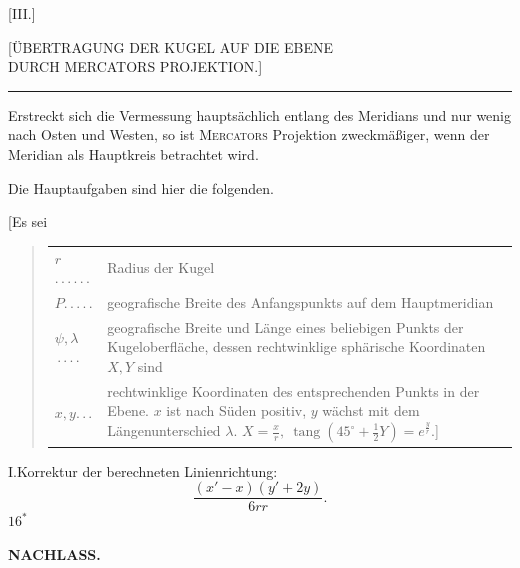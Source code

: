 \par\clearpage

\thispagestyle{empty}
\vspace*{4\baselineskip}
\begin{center}
{\large [III.]}\par\bigskip
{\Large [ÜBERTRAGUNG DER KUGEL AUF DIE EBENE\\
DURCH MERCATORS PROJEKTION.]}\par\bigskip
\rule{.09\linewidth}{.4pt}\par\bigskip
[1.]
\end{center}
Erstreckt sich die Vermessung hauptsächlich entlang des Meridians und nur
wenig nach Osten und Westen, so ist \textsc{Mercators} Projektion zweckmäßiger,
wenn der Meridian als Hauptkreis betrachtet wird.

Die Hauptaufgaben sind hier die folgenden.

[Es sei
\begin{quote}
\setlength{\tabcolsep}{0pt}
\begin{tabular}{@{}lp{.82\linewidth}@{}}
\(r\)\enspace.\,.\,.\,.\,.\,. & Radius der Kugel\\
\(P\)\enspace.\,.\,.\,.\,. & geografische Breite des Anfangspunkts auf dem Hauptmeridian\\
\(\psi,\lambda\)\,.\,.\,.\,. & geografische Breite und Länge eines beliebigen Punkts der
Kugeloberfläche, dessen rechtwinklige sphärische Koordinaten \(X,Y\) sind\\
\(x,y\)\enspace.\,.\,. & rechtwinklige Koordinaten des entsprechenden Punkts in der Ebene.
\(x\) ist nach Süden positiv, \(y\) wächst mit dem Längenunterschied \(\lambda\).
\quad \(X=\frac xr,\ \operatorname{tang}(45^\circ+\tfrac12Y)=e^{\frac yr}\).]
\end{tabular}
\end{quote}
I.\quad Korrektur der berechneten Linienrichtung:
\[
\frac{(x'-x)(y'+2y)}{6rr}.
\]
\noindent\hfill \(16^{*}\)\hspace*{.14\linewidth}\par

\par\clearpage
\noindent{}\hfill{\small\textbf{NACHLASS.}}\hfill\null\par\medskip

